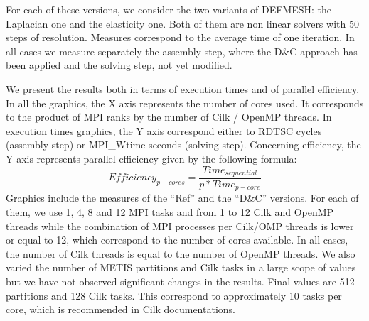 \documentclass{IOS-Book-Article}
\begin{document}
For each of these versions, we consider the two variants of DEFMESH: the Laplacian one and the elasticity one.
Both of them are non linear solvers with 50 steps of resolution. Measures correspond to the average time of one iteration.
In all cases we measure separately the assembly step, where the D\&C approach has been applied and the solving step, not yet modified.

We present the results both in terms of execution times and of parallel efficiency.
In all the graphics, the X axis represents the number of cores used. It corresponds to the product of MPI ranks by the number of Cilk / OpenMP threads.
In execution times graphics, the Y axis correspond either to RDTSC cycles (assembly step) or MPI\_Wtime seconds (solving step).
Concerning efficiency, the Y axis represents parallel efficiency given by the following formula:
$$Efficiency_{p-cores} = \frac{Time_{sequential}}{p*Time_{p-core}}$$
Graphics include the measures of the “Ref” and the “D\&C” versions.
For each of them, we use 1, 4, 8 and 12 MPI tasks and from 1 to 12 Cilk and OpenMP threads while the combination of MPI processes per Cilk/OMP threads is lower or equal to 12,
which correspond to the number of cores available. In all cases, the number of Cilk threads is equal to the number of OpenMP threads.
We also varied the number of METIS partitions and Cilk tasks in a large scope of values but we have not observed significant changes in the results.
Final values are 512 partitions and 128 Cilk tasks. This correspond to approximately 10 tasks per core, which is recommended in Cilk documentations.
\end{document}
